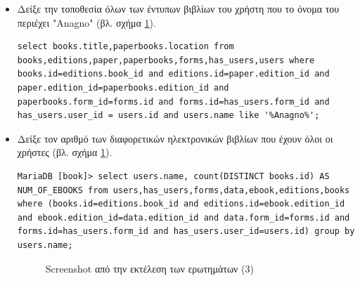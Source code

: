 \documentclass{assignment}
\begin{document}
\begin{itemize}
\item Δείξε την τοποθεσία όλων των έντυπων βιβλίων του χρήστη που το όνομα του περιέχει "Anagno" (βλ. σχήμα \ref{fig:queries_3}).
\begin{verbatim}
select books.title,paperbooks.location from books,editions,paper,paperbooks,forms,has_users,users where books.id=editions.book_id and editions.id=paper.edition_id and paper.edition_id=paperbooks.edition_id and paperbooks.form_id=forms.id and forms.id=has_users.form_id and has_users.user_id = users.id and users.name like '%Anagno%';
\end{verbatim}

\item Δείξε τον αριθμό των διαφορετικών ηλεκτρονικών βιβλίων που έχουν όλοι οι χρήστες (βλ. σχήμα \ref{fig:queries_3}).
\begin{verbatim}
MariaDB [book]> select users.name, count(DISTINCT books.id) AS NUM_OF_EBOOKS from users,has_users,forms,data,ebook,editions,books where (books.id=editions.book_id and editions.id=ebook.edition_id and ebook.edition_id=data.edition_id and data.form_id=forms.id and forms.id=has_users.form_id and has_users.user_id=users.id) group by users.name;
\end{verbatim}

\begin{figure}
\begin{center}
\caption{Screenshot από την εκτέλεση των ερωτημάτων (3)}
\label{fig:queries_3}
\end{center}
\end{figure}

\end{itemize}

 \label{Βιβλιογραφία}



\newpage
\end{document}
